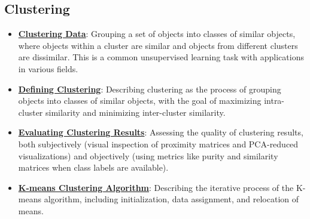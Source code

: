 \documentclass{article}%
\begin{document}
\subsection{Clustering}%
\label{subsec:Clustering}%
\begin{itemize}[leftmargin=*]%
\item \href{https://purdue.brightspace.com/d2l/common/assets/pdfjs-d2l-dist/1.0.14-legacy/web/viewer.html?file=\%2Fcontent\%2Fenforced\%2F1095467-wl.202510.CS.24300.001\%2F12L2-distance-clusters.pdf\%3Fou\%3D1095467\&lang=en-us\&container=d2l-fileviewer-rendered-pdf\&fullscreen=d2l-fileviewer-rendered-pdf-dialog\&height=667#page=4}{\textbf{Clustering Data}}: Grouping a set of objects into classes of similar objects, where objects within a cluster are similar and objects from different clusters are dissimilar. This is a common unsupervised learning task with applications in various fields.%
\item \href{https://purdue.brightspace.com/d2l/common/assets/pdfjs-d2l-dist/1.0.14-legacy/web/viewer.html?file=\%2Fcontent\%2Fenforced\%2F1095467-wl.202510.CS.24300.001\%2F12L2-distance-clusters.pdf\%3Fou\%3D1095467\&lang=en-us\&container=d2l-fileviewer-rendered-pdf\&fullscreen=d2l-fileviewer-rendered-pdf-dialog\&height=667#page=4}{\textbf{Defining Clustering}}: Describing clustering as the process of grouping objects into classes of similar objects, with the goal of maximizing intra-cluster similarity and minimizing inter-cluster similarity.%
\item \href{https://purdue.brightspace.com/d2l/common/assets/pdfjs-d2l-dist/1.0.14-legacy/web/viewer.html?file=\%2Fcontent\%2Fenforced\%2F1095467-wl.202510.CS.24300.001\%2F12L2-distance-clusters.pdf\%3Fou\%3D1095467\&lang=en-us\&container=d2l-fileviewer-rendered-pdf\&fullscreen=d2l-fileviewer-rendered-pdf-dialog\&height=667#page=32}{\textbf{Evaluating Clustering Results}}: Assessing the quality of clustering results, both subjectively (visual inspection of proximity matrices and PCA-reduced visualizations) and objectively (using metrics like purity and similarity matrices when class labels are available).%
\item \href{https://purdue.brightspace.com/d2l/common/assets/pdfjs-d2l-dist/1.0.14-legacy/web/viewer.html?file=\%2Fcontent\%2Fenforced\%2F1095467-wl.202510.CS.24300.001\%2F12L2-distance-clusters.pdf\%3Fou\%3D1095467\&lang=en-us\&container=d2l-fileviewer-rendered-pdf\&fullscreen=d2l-fileviewer-rendered-pdf-dialog\&height=667#page=21}{\textbf{K-means Clustering Algorithm}}: Describing the iterative process of the K-means algorithm, including initialization, data assignment, and relocation of means.%

\end{itemize}
\end{document}
